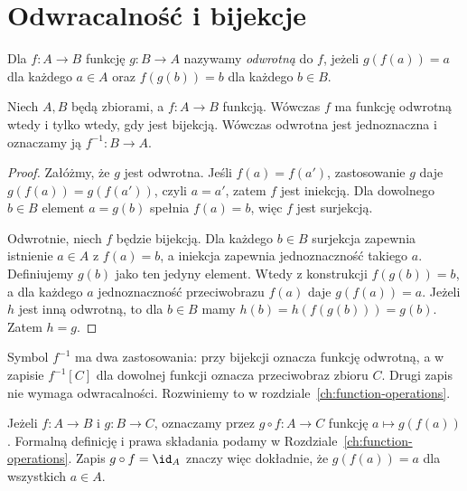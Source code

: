 \section{Odwracalność i bijekcje}
\begin{definicja}
Dla $f:A\to B$ funkcję $g:B\to A$ nazywamy \emph{odwrotną} do $f$, jeżeli $g(f(a))=a$ dla każdego $a\in A$ oraz $f(g(b))=b$ dla każdego $b\in B$.
\end{definicja}
\begin{twierdzenie}\label{thm:inverse-iff-bij}
Niech $A,B$ będą zbiorami, a $f:A\to B$ funkcją. Wówczas $f$ ma funkcję odwrotną wtedy i tylko wtedy, gdy jest bijekcją. Wówczas odwrotna jest jednoznaczna i oznaczamy ją $f^{-1}:B\to A$.
\end{twierdzenie}
\begin{proof}
Załóżmy, że $g$ jest odwrotna. Jeśli $f(a)=f(a')$, zastosowanie $g$ daje $g(f(a))=g(f(a'))$, czyli $a=a'$, zatem $f$ jest iniekcją. Dla dowolnego $b\in B$ element $a=g(b)$ spełnia $f(a)=b$, więc $f$ jest surjekcją.

Odwrotnie, niech $f$ będzie bijekcją. Dla każdego $b\in B$ surjekcja zapewnia istnienie $a\in A$ z $f(a)=b$, a iniekcja zapewnia jednoznaczność takiego $a$. Definiujemy $g(b)$ jako ten jedyny element. Wtedy z konstrukcji $f(g(b))=b$, a dla każdego $a$ jednoznaczność przeciwobrazu $f(a)$ daje $g(f(a))=a$. Jeżeli $h$ jest inną odwrotną, to dla $b\in B$ mamy $h(b)=h(f(g(b)))=g(b)$. Zatem $h=g$.
\end{proof}
\begin{uwaga}
Symbol $f^{-1}$ ma dwa zastosowania: przy bijekcji oznacza funkcję odwrotną, a w zapisie $f^{-1}[C]$ dla dowolnej funkcji oznacza przeciwobraz zbioru $C$. Drugi zapis nie wymaga odwracalności. Rozwiniemy to w rozdziale~\ref{ch:function-operations}.
\end{uwaga}


\begin{uwaga}
Jeżeli $f:A\to B$ i $g:B\to C$, oznaczamy przez $g\circ f:A\to C$
funkcję $a\mapsto g(f(a))$. Formalną definicję i prawa składania
podamy w Rozdziale~\ref{ch:function-operations}. Zapis
$g\circ f=\id_A$ znaczy więc dokładnie, że $g(f(a))=a$
dla wszystkich $a\in A$.
\end{uwaga}

